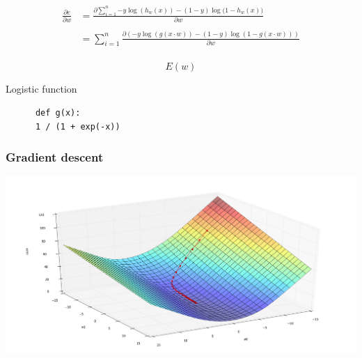     \begin{frame}
      \begin{equation*}
        \begin{split}
          \frac{\partial e}{\partial w} & = \frac{\partial \displaystyle\sum_{i =
        1}^n{-y \log(h_w(x)) - (1 - y) \log(1 -
      h_w(x)})}{\partial w} \\~\\
      & = \displaystyle\sum_{i = 1}^n{\frac{\partial(-y \log(g(x \cdot
  w)) - (1 - y) \log(1 - g(x \cdot w)))}{\partial w}} \\
\end{split}
  \end{equation*}
\end{frame}

\begin{frame}
  \begin{equation*}
    E(w)
  \end{equation*}
\end{frame}

\begin{frame}[fragile]
  \begin{block}{Logistic function}
    \begin{lstlisting}
      def g(x):
      1 / (1 + exp(-x))
    \end{lstlisting}
  \end{block}
\end{frame}

\begin{frame}
  \frametitle{Gradient descent}
  \begin{center}
    \includegraphics[scale=0.22]{./pictures/gradient_descent.png}
  \end{center}
\end{frame}

\begin{frame}
\end{frame}


